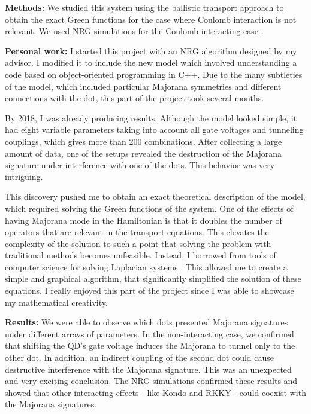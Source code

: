 \noindent \textbf{Methods:} We studied this system using the ballistic transport \cite{zubarev_double-time_1960} approach to obtain the exact Green functions for the case where Coulomb interaction is not relevant. We used NRG simulations  for the Coulomb interacting case \cite{wilson_renormalization_1975,krishna-murthy_renormalization-group_1980,bimberg_quantum_1999}. 

\noindent \textbf{Personal work:} I started this project with an NRG algorithm designed by my advisor. I modified it to include the new model which involved understanding a code based on object-oriented programming in C++. Due to the many subtleties of the model, which included particular Majorana symmetries and different connections with the dot, this part of the project took several months. 

By 2018, I was already producing results. Although the model looked simple, it had eight variable parameters taking into account all gate voltages and tunneling couplings, which gives more than 200 combinations. After collecting a large amount of data, one of the setups revealed the destruction of the Majorana signature under interference with one of the dots. This behavior was very intriguing. 

This discovery pushed me to obtain an exact theoretical description of the model, which required solving the Green functions of the system. One of the effects of having Majorana mode in the Hamiltonian is that it doubles the number of operators that are relevant in the transport equations. This elevates the complexity of the solution to such a point that solving the problem with traditional methods becomes unfeasible. Instead, I borrowed from tools of computer science for solving Laplacian systems \cite{spielman_algorithms_2010}. This allowed me to create a simple and graphical algorithm, that significantly simplified the solution of these equations. I really enjoyed this part of the project since I was able to showcase my mathematical creativity. 

\noindent \textbf{Results:} We were able to observe which dots presented Majorana signatures under different arrays of parameters. In the non-interacting case, we confirmed that shifting the QD’s gate voltage induces the Majorana to tunnel only to the other dot. In addition, an indirect coupling of the second dot could cause destructive interference with the Majorana signature. This was an unexpected and very exciting conclusion. The NRG simulations confirmed these results and showed that other interacting effects - like Kondo \cite{hewson_kondo_1997} and RKKY\cite{onsager_crystal_1944,yosida_magnetic_1957} - could coexist with the Majorana signatures. 

